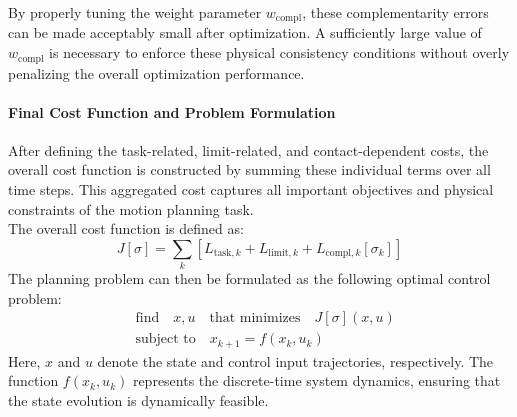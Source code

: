 \documentclass[main.tex]{subfiles}
\begin{document}
By properly tuning the weight parameter $w_{\text{compl}}$, these complementarity errors can be made acceptably small after optimization. A sufficiently large value of $w_{\text{compl}}$ is necessary to enforce these physical consistency conditions without overly penalizing the overall optimization performance.
\paragraph{Final Cost Function and Problem Formulation}
After defining the task-related, limit-related, and contact-dependent costs, the overall cost function is constructed by summing these individual terms over all time steps. This aggregated cost captures all important objectives and physical constraints of the motion planning task.
\\
The overall cost function is defined as:
\begin{equation}
J[\sigma] = \sum_k \left[ L_{\text{task},k} + L_{\text{limit},k} + L_{\text{compl},k}[\sigma_k] \right]
\end{equation}
The planning problem can then be formulated as the following optimal control problem:
\begin{equation}
\begin{aligned}
& \text{find} \quad x, u \quad \text{that minimizes} \quad J[\sigma](x,u) \\
& \text{subject to} \quad x_{k+1} = f(x_k, u_k)
\end{aligned}
\end{equation}
Here, $x$ and $u$ denote the state and control input trajectories, respectively. The function $f(x_k, u_k)$ represents the discrete-time system dynamics, ensuring that the state evolution is dynamically feasible.
\begin{comment}
This problem is formulated using a \textit{single shooting} approach, where the control inputs are directly optimized and the states are obtained by integrating the system dynamics forward in time. 
Due to the nonlinearities in the cost terms (especially those involving contact forces and constraints) and the system dynamics, the resulting optimization is generally a \textit{nonlinear programming problem} (NLP). However, in certain cases where the dynamics and cost functions are affine and the constraints are quadratic, the problem structure could be approximated as a \textit{quadratic programming} (QP) problem to enable faster computation.
Overall, the optimization simultaneously enforces task tracking, physical feasibility, and complementarity conditions related to contact interactions throughout the planned motion.
\end{comment}
\end{document}
